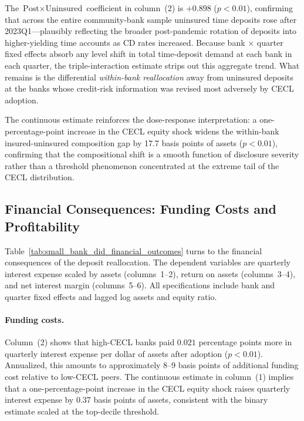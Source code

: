The $\text{Post} \times \text{Uninsured}$ coefficient in column~(2) is $+0.898$
($p < 0.01$), confirming that across the entire community-bank sample uninsured
time deposits rose after 2023Q1---plausibly reflecting the broader post-pandemic
rotation of deposits into higher-yielding time accounts as CD rates increased.
Because bank $\times$ quarter fixed effects absorb any level shift in total
time-deposit demand at each bank in each quarter, the triple-interaction estimate
strips out this aggregate trend.  What remains is the differential
\emph{within-bank reallocation} away from uninsured deposits at the banks whose
credit-risk information was revised most adversely by CECL adoption.

The continuous estimate reinforces the dose-response interpretation: a
one-percentage-point increase in the CECL equity shock widens the within-bank
insured-uninsured composition gap by 17.7 basis points of assets ($p < 0.01$),
confirming that the compositional shift is a smooth function of disclosure
severity rather than a threshold phenomenon concentrated at the extreme tail of
the CECL distribution.

\subsection{Financial Consequences: Funding Costs and Profitability}
\label{sec:results:financial}

Table~\ref{tab:small_bank_did_financial_outcomes} turns to the financial
consequences of the deposit reallocation.  The dependent variables are quarterly
interest expense scaled by assets (columns~1--2), return on assets
(columns~3--4), and net interest margin (columns~5--6).  All specifications
include bank and quarter fixed effects and lagged log assets and equity ratio.

\paragraph{Funding costs.}
Column~(2) shows that high-CECL banks paid $0.021$ percentage points more in
quarterly interest expense per dollar of assets after adoption ($p < 0.01$).
Annualized, this amounts to approximately 8--9 basis points of additional funding
cost relative to low-CECL peers.  The continuous estimate in column~(1) implies
that a one-percentage-point increase in the CECL equity shock raises quarterly
interest expense by 0.37 basis points of assets, consistent with the binary
estimate scaled at the top-decile threshold.


